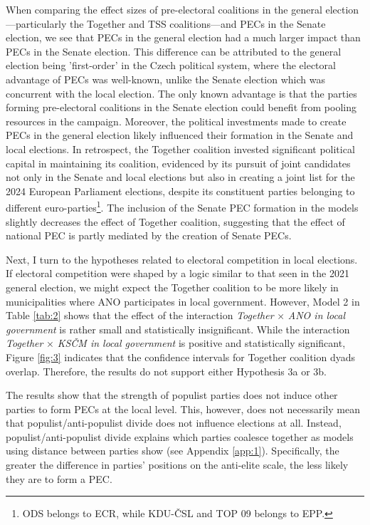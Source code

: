 \documentclass[]{interact}
\theoremstyle{plain}%
\theoremstyle{definition}
\theoremstyle{remark}
\begin{document}


When comparing the effect sizes of pre-electoral coalitions in the general election—particularly the Together and TSS coalitions—and PECs in the Senate election, we see that PECs in the general election had a much larger impact than PECs in the Senate election. This difference can be attributed to the general election being 'first-order' in the Czech political system, where the electoral advantage of PECs was well-known, unlike the Senate election which was concurrent with the local election. The only known advantage is that the parties forming pre-electoral coalitions in the Senate election could benefit from pooling resources in the campaign. Moreover, the political investments made to create PECs in the general election likely influenced their formation in the Senate and local elections. In retrospect, the Together coalition invested significant political capital in maintaining its coalition, evidenced by its pursuit of joint candidates not only in the Senate and local elections but also in creating a joint list for the 2024 European Parliament elections, despite its constituent parties belonging to different euro-parties\footnote{ODS belongs to ECR, while KDU-ČSL and TOP 09 belongs to EPP.}. The inclusion of the Senate PEC formation in the models slightly decreases the effect of Together coalition, suggesting that the effect of national PEC is partly mediated by the creation of Senate PECs.

Next, I turn to the hypotheses related to electoral competition in local elections. If electoral competition were shaped by a logic similar to that seen in the 2021 general election, we might expect the Together coalition to be more likely in municipalities where ANO participates in local government. However, Model 2 in Table \ref{tab:2} shows that the effect of the interaction \emph{Together} $\times$ \emph{ANO in local government} is rather small and statistically insignificant. While the interaction \emph{Together} $\times$ \emph{KSČM in local government} is positive and statistically significant, Figure \ref{fig:3} indicates that the confidence intervals for Together coalition dyads overlap. Therefore, the results do not support either Hypothesis 3a or 3b.

The results show that the strength of populist parties does not induce other parties to form PECs at the local level. This, however, does not necessarily mean that populist/anti-populist divide does not influence elections at all. Instead, populist/anti-populist divide explains which parties coalesce together as models using distance between parties show (see Appendix \ref{app:1}). Specifically, the greater the difference in parties' positions on the anti-elite scale, the less likely they are to form a PEC.
\end{document}
